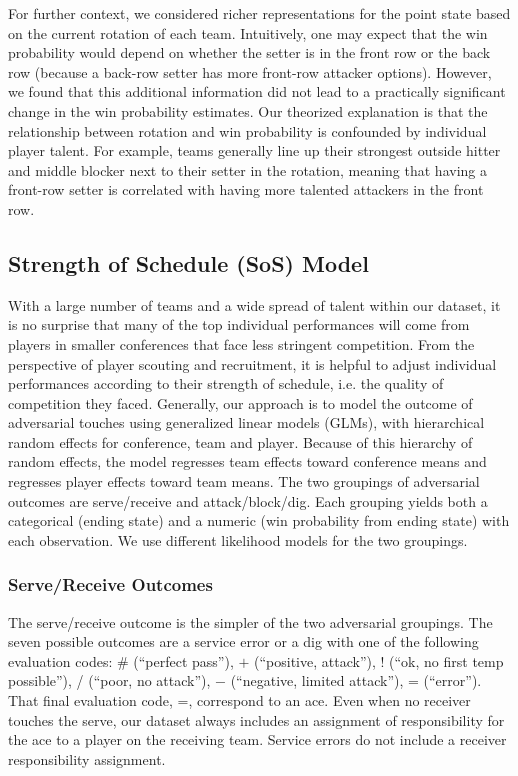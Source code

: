 \documentclass[USenglish]{article}
\theoremstyle{dgthm}
\theoremstyle{dgdef}
\begin{document}
For further context, we considered richer representations for the point state based on the current rotation of each team. Intuitively, one may expect that the win probability would depend on whether the setter is in the front row or the back row (because a back-row setter has more front-row attacker options). However, we found that this additional information did not lead to a practically significant change in the win probability estimates. Our theorized explanation is that the relationship between rotation and win probability is confounded by individual player talent. For example, teams generally line up their strongest outside hitter and middle blocker next to their setter in the rotation, meaning that having a front-row setter is correlated with having more talented attackers in the front row.

\subsection{Strength of Schedule (SoS) Model}
\label{sec:strength-of-schedule}

With a large number of teams and a wide spread of talent within our dataset, it is no surprise that many of the top individual performances will come from players in smaller conferences that face less stringent competition. From the perspective of player scouting and recruitment, it is helpful to adjust individual performances according to their strength of schedule, i.e. the quality of competition they faced. Generally, our approach is to model the outcome of adversarial touches using generalized linear models (GLMs), with hierarchical random effects for conference, team and player. Because of this hierarchy of random effects, the model regresses team effects toward conference means and regresses player effects toward team means. The two groupings of adversarial outcomes are serve/receive and attack/block/dig. Each grouping yields both a categorical (ending state) and a numeric (win probability from ending state) with each observation. We use different likelihood models for the two groupings.

\subsubsection{Serve/Receive Outcomes}

The serve/receive outcome is the simpler of the two adversarial groupings. The seven possible outcomes are a service error or a dig with one of the following evaluation codes: \# (``perfect pass''), $+$ (``positive, attack''), $!$ (``ok, no first temp possible''), / (``poor, no attack''), $-$ (``negative, limited attack''), = (``error''). That final evaluation code, =, correspond to an ace. Even when no receiver touches the serve, our dataset always includes an assignment of responsibility for the ace to a player on the receiving team. Service errors do not include a receiver responsibility assignment.
\end{document}
